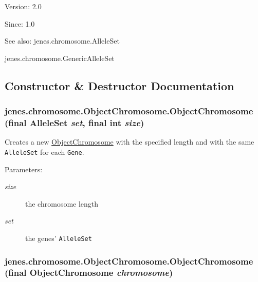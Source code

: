 \begin{Desc}
\item[Version:]2.0 \end{Desc}
\begin{Desc}
\item[Since:]1.0\end{Desc}
\begin{Desc}
\item[See also:]jenes.chromosome.AlleleSet 

jenes.chromosome.GenericAlleleSet \end{Desc}


\subsection{Constructor \& Destructor Documentation}
\hypertarget{classjenes_1_1chromosome_1_1_object_chromosome_5af7d34bc1f7260dca1dc5c38135f4a4}{
\subsubsection[ObjectChromosome]{\setlength{\rightskip}{0pt plus 5cm}jenes.chromosome.ObjectChromosome.ObjectChromosome (final AlleleSet {\em set}, \/  final int {\em size})}}
\label{classjenes_1_1chromosome_1_1_object_chromosome_5af7d34bc1f7260dca1dc5c38135f4a4}


Creates a new \hyperlink{classjenes_1_1chromosome_1_1_object_chromosome}{ObjectChromosome} with the specified length and with the same {\tt AlleleSet} for each {\tt Gene}. 

\begin{Desc}
\item[Parameters:]
\begin{description}
\item[{\em size}]the chromosome length \item[{\em set}]the genes' {\tt AlleleSet} \end{description}
\end{Desc}
\hypertarget{classjenes_1_1chromosome_1_1_object_chromosome_59e25d20fb54d53ff2b4adc53177d7d2}{
\subsubsection[ObjectChromosome]{\setlength{\rightskip}{0pt plus 5cm}jenes.chromosome.ObjectChromosome.ObjectChromosome (final {\bf ObjectChromosome} {\em chromosome})}}
\label{classjenes_1_1chromosome_1_1_object_chromosome_59e25d20fb54d53ff2b4adc53177d7d2}


